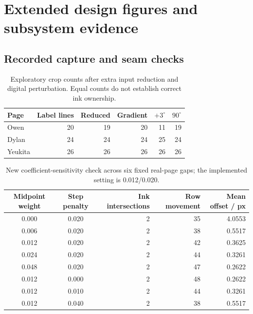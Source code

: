 \section{Extended design figures and subsystem evidence}\label{app:des-visual-tests}
\subsection{Recorded capture and seam checks}
\begin{table}[H]\centering\small
\begin{tabular}{lrrrrr}\hline
Page & Label lines & Reduced & Gradient & $+3^\circ$ & $90^\circ$ \\\hline
Owen & 20 & 19 & 20 & 11 & 19 \\
Dylan & 24 & 24 & 24 & 25 & 24 \\
Yeukita & 26 & 26 & 26 & 26 & 26 \\
\hline\end{tabular}
\caption{Exploratory crop counts after extra input reduction and digital perturbation. Equal counts do not establish correct ink ownership.}
\label{tab:des-resample-cases}
\end{table}
\begin{table}[H]\centering\small
\begin{tabular}{|c|c|r|r|r|}
\hline Midpoint weight&Step penalty&Ink intersections&Row movement&Mean offset / px\\\hline
0.000&0.020&2&35&4.0553\\\hline
0.006&0.020&2&38&0.5517\\\hline
0.012&0.020&2&42&0.3625\\\hline
0.024&0.020&2&44&0.3261\\\hline
0.048&0.020&2&47&0.2622\\\hline
0.012&0.000&2&48&0.2622\\\hline
0.012&0.010&2&44&0.3261\\\hline
0.012&0.040&2&38&0.5517\\\hline
\end{tabular}
\caption{New coefficient-sensitivity check across six fixed real-page gaps; the implemented setting is 0.012/0.020.}
\label{tab:app-seam-sweep}
\end{table}
\label{app:des-seam-sweep}
